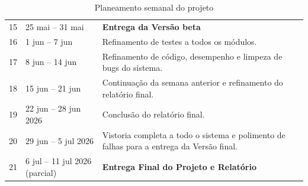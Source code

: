 \documentclass[11pt,a4paper]{report}
\begin{document}
\begin{table}[H]
\begin{tabular}{|c|l|p{11.0cm}|}
            15 & 25 mai -- 31 mai & \textbf{Entrega da Versão beta} \\
            16 & 1 jun -- 7 jun & Refinamento de testes a todos os módulos. \\
            17 & 8 jun -- 14 jun & Refinamento de código, desempenho e limpeza de bugs do sistema. \\
            18 & 15 jun -- 21 jun & Continuação da semana anterior e refinamento do relatório final. \\
            19 & 22 jun -- 28 jun 2026 & Conclusão do relatório final. \\
            20 & 29 jun -- 5 jul 2026 & Vistoria completa a todo o sistema e polimento de falhas para a entrega da Versão final. \\
            21 & 6 jul -- 11 jul 2026 (parcial) & \textbf{Entrega Final do Projeto e Relatório} \\
            \hline
        \end{tabular}
        \caption{Planeamento semanal do projeto}
    \end{table}


    \renewcommand{\bibname}{Referências}
    
    
\end{document}
